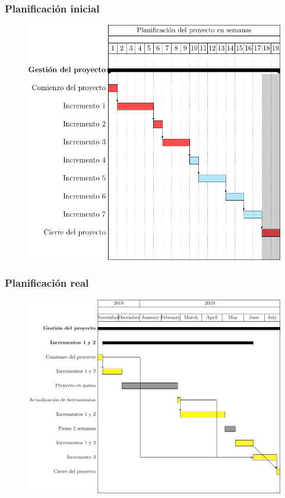 \documentclass[a4paper,10pt]{beamer}
\begin{document}
\begin{frame}[fragile]
	\frametitle{Planificación inicial}

	\begin{figure}[H]
		\centering
		\includegraphics[width=.7\textwidth]{figuras/inicial.png}
	\end{figure}

\end{frame}

\begin{frame}[fragile]
	\frametitle{Planificación real}

	\begin{figure}[H]
		\centering
		\includegraphics[width=.8\textwidth]{figuras/final.png}
	\end{figure}

\end{frame}
\end{document}
